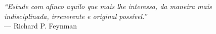 \begin{epigrafe}
  \vspace*{\fill}
  \begin{flushright}
    \begin{SingleSpace}

      \textit{``Estude com afinco aquilo que mais lhe interessa, da maneira mais indisciplinada, irreverente e original possível.''} \\
      --- Richard P. Feynman

    \end{SingleSpace}
  \end{flushright}
\end{epigrafe}